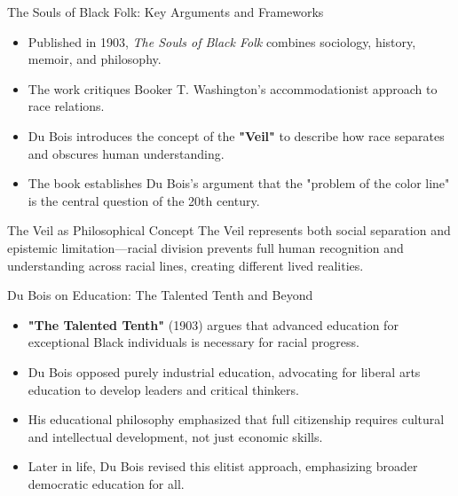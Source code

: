 \documentclass{beamer}
\begin{document}
	\begin{frame}{The Souls of Black Folk: Key Arguments and Frameworks}
		\begin{itemize}
			\item Published in 1903, \textit{The Souls of Black Folk} combines sociology, history, memoir, and philosophy.
			\item The work critiques Booker T. Washington's accommodationist approach to race relations.
			\item Du Bois introduces the concept of the \textbf{"Veil"} to describe how race separates and obscures human understanding.
			\item The book establishes Du Bois's argument that the "problem of the color line" is the central question of the 20th century.
		\end{itemize}
		
		\begin{exampleblock}{The Veil as Philosophical Concept}
			The Veil represents both social separation and epistemic limitation—racial division prevents full human recognition and understanding across racial lines, creating different lived realities.
		\end{exampleblock}
	\end{frame}
	
	\begin{frame}{Du Bois on Education: The Talented Tenth and Beyond}
		\begin{itemize}
			\item \textbf{"The Talented Tenth"} (1903) argues that advanced education for exceptional Black individuals is necessary for racial progress.
			\item Du Bois opposed purely industrial education, advocating for liberal arts education to develop leaders and critical thinkers.
			\item His educational philosophy emphasized that full citizenship requires cultural and intellectual development, not just economic skills.
			\item Later in life, Du Bois revised this elitist approach, emphasizing broader democratic education for all.
		\end{itemize}

	\end{frame}
	
\end{document}
